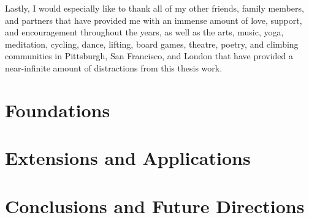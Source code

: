 \documentclass[12pt]{cmuthesis}
\begin{document}
\begin{acknowledgments}
  Lastly, I would especially like to thank all of my
  other friends, family members, and partners that
  have provided me with an immense amount of love,
  support, and encouragement throughout the years,
  as well as the arts, music, yoga, meditation, cycling, dance,
  lifting, board games, theatre, poetry,
  and climbing communities in
  Pittsburgh, San Francisco, and London that have
  provided a near-infinite amount of distractions
  from this thesis work.
\end{acknowledgments}

\pagestyle{plain}

\tableofcontents
\listoffigures
\listoftables
\listofalgorithms

\mainmatter




\part{Foundations}



\part{Extensions and Applications}




\part{Conclusions and Future Directions}


\printbibliography[heading=bibintoc]
\end{document}
